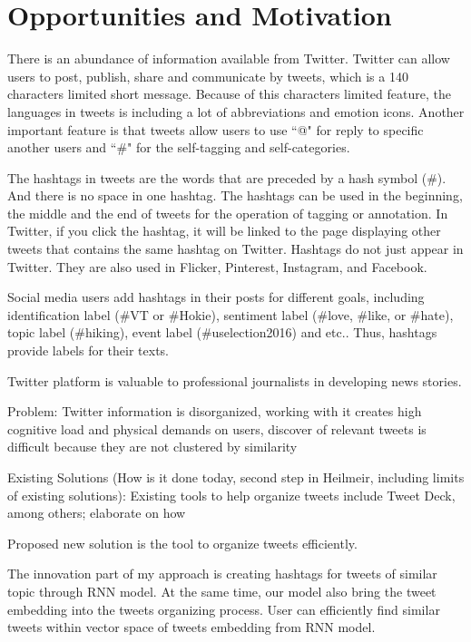 
\section{Opportunities and Motivation}

There is an abundance of information available from Twitter. Twitter can allow users to post, publish, share and communicate by tweets, which is a 140 characters limited short message. Because of this characters limited feature, the languages in tweets is including a lot of abbreviations and emotion icons. Another important feature is that tweets allow users to use ``@" for reply to specific another users and ``\#" for the self-tagging and self-categories. 

The hashtags in tweets are the words that are preceded by a hash symbol (\#). And there is no space in one hashtag. The hashtags can be used in the beginning, the middle and the end of tweets for the operation of tagging or annotation. In Twitter, if you click the hashtag, it will be linked to the page displaying other tweets that contains the same hashtag on Twitter. Hashtags do not just appear in Twitter. They are also used in Flicker, Pinterest, Instagram, and Facebook. 


Social media users add hashtags in their posts for different goals, including identification label (\#VT or \#Hokie), sentiment label (\#love, \#like, or \#hate), topic label (\#hiking), event label (\#uselection2016) and etc.. Thus, hashtags provide labels for their texts.



Twitter platform is valuable to professional journalists in developing news stories. 

Problem: Twitter information is disorganized, working with it creates high cognitive load and physical demands on users, discover of relevant tweets is difficult because they are not clustered by similarity 

Existing Solutions (How is it done today, second step in Heilmeir, including limits of existing solutions): Existing tools to help organize tweets include Tweet Deck, among others; elaborate on how


Proposed new solution is the tool to organize tweets efficiently. 

The innovation part of my approach is creating hashtags for tweets of similar topic through RNN model. At the same time, our model also bring the tweet embedding into the tweets organizing process.  User can efficiently find similar tweets within vector space of tweets embedding from RNN model. 

